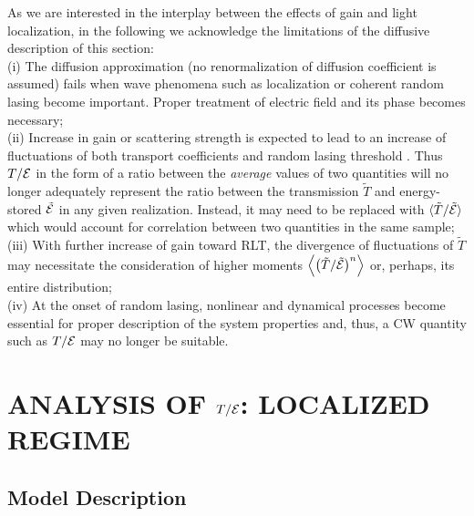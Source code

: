 As we are interested in the interplay between the effects of gain and light localization, in the following we acknowledge the limitations of the diffusive description of this section:\\
(i) The diffusion approximation (no renormalization of diffusion coefficient is assumed) fails when wave phenomena such as localization or coherent random lasing become important. Proper treatment of electric field and its phase becomes necessary;\\
(ii) Increase in gain or scattering strength is expected to lead to an increase of fluctuations of both transport coefficients \cite{2005_Yamilov_correlations} and random lasing threshold \cite{1995_zyuzin_fluctuations}. Thus $T/{\cal E}$ in the form of a ratio between the {\it average} values of two quantities will no longer adequately represent the ratio between the transmission $\tilde{T}$ and energy-stored $\tilde{\cal E}$ in any given realization. Instead, it may need to be replaced with $\langle \tilde{T}/\tilde{\cal E}\rangle$ which would account for correlation between two quantities in the same sample;\\
(iii) With further increase of gain toward RLT, the divergence of fluctuations of $\tilde{T}$ may necessitate the consideration of higher moments $\left\langle \left(\tilde{T}/\tilde{\cal E}\right)^n\right\rangle$ or, perhaps, its entire distribution; \\
(iv) At the onset of random lasing, nonlinear and dynamical processes\cite{2005_Cao,2009_Deych_random_laser_theory,2008_Stone,2008_Conti_opals,2009_Frank} become essential for proper description of the system properties and, thus, a CW quantity such as $T/{\cal E}$ may no longer be suitable.

\section{ANALYSIS OF \texorpdfstring{$T/{\cal E}$}{T/E}: LOCALIZED REGIME}
\label{sec:localization_passive}

\subsection{Model Description}
\label{sec:numerical_model}


